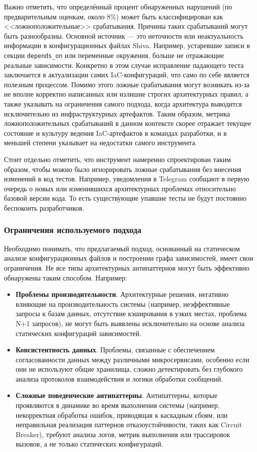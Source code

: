 Важно отметить, что определённый процент обнаруженных нарушений (по предварительным оценкам, около 8\%) может быть классифицирован как <<ложноположительные>> срабатывания. Причины таких срабатываний могут быть разнообразны. Основной источник — это неточности или неактуальность информации в конфигурационных файлах Shiva. Например, устаревшие записи в секции \verb|depends_on| или переменные окружения, больше не отражающие реальные зависимости. Конкретно в этом случае исправление падающего теста заключается в актуализации самих IaC-конфигураций, что само по себе является полезным процессом. Помимо этого ложные срабатывания могут возникать из-за не вполне корректно написанных или излишне строгих архитектурных правил, а также указывать на ограничения самого подхода, когда архитектура выводится исключительно из инфраструктурных артефактов. Таким образом, метрика ложноположительных срабатываний в данном контексте скорее отражает текущее состояние и культуру ведения IaC-артефактов в командах разработки, и в меньшей степени указывает на недостатки самого инструмента.

Стоит отдельно отметить, что инструмент намеренно спроектирован таким образом, чтобы можно было игнорировать ложные срабатывания без внесения изменений в код тестов. Например, уведомления в Telegram сообщают в первую очередь о новых или изменившихся архитектурных проблемах относительно базовой версии кода. То есть существующие упавшие тесты не будут постоянно беспокоить разработчиков.

\subsubsection{Ограничения используемого подхода}

Необходимо понимать, что предлагаемый подход, основанный на статическом анализе конфигурационных файлов и построении графа зависимостей, имеет свои ограничения. Не все типы архитектурных антипаттернов могут быть эффективно обнаружены таким способом. Например:
\begin{itemize}
    \item \textbf{Проблемы производительности}. Архитектурные решения, негативно влияющие на производительность системы (например, неэффективные запросы к базам данных, отсутствие кэширования в узких местах, проблема N+1 запросов), не могут быть выявлены исключительно на основе анализа статических конфигураций зависимостей.
    \item \textbf{Консистентность данных}. Проблемы, связанные с обеспечением согласованности данных между различными микросервисами, особенно если они не используют общие хранилища, сложно детектировать без глубокого анализа протоколов взаимодействия и логики обработки сообщений.
    \item \textbf{Сложные поведенческие антипаттерны}. Антипаттерны, которые проявляются в динамике во время выполнения системы (например, некорректная обработка ошибок, приводящая к каскадным сбоям, или неправильная реализация паттернов отказоустойчивости, таких как Circuit Breaker), требуют анализа логов, метрик выполнения или трассировок вызовов, а не только статических конфигураций.
\end{itemize}

